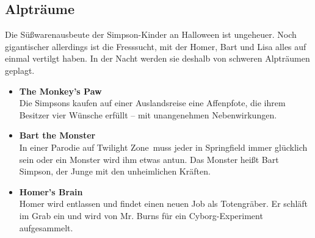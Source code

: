 
\subsection{Alpträume}\label{8F02}
Die Süßwarenausbeute der Simpson-Kinder an Halloween ist ungeheuer. Noch gigantischer allerdings ist die Fresssucht, mit der Homer, Bart und Lisa alles auf einmal vertilgt haben. In der Nacht werden sie deshalb von schweren Alpträumen geplagt. 
\begin{itemize}
	\item \textbf{The Monkey's Paw}\\ Die Simpsons kaufen auf einer Auslandsreise eine Affenpfote, die ihrem Besitzer vier Wünsche erfüllt -- mit unangenehmen Nebenwirkungen.
   \item \textbf{Bart the Monster}\\ In einer Parodie auf \glqq Twilight Zone\grqq\ muss jeder in Springfield immer glücklich sein oder ein Monster wird ihm etwas antun. Das Monster heißt Bart Simpson, der Junge mit den unheimlichen Kräften.
   \item \textbf{Homer's Brain}\\ Homer wird entlassen und findet einen neuen Job als Totengräber. Er schläft im Grab ein und wird von Mr. Burns für ein Cyborg-Experiment aufgesammelt.
\end{itemize}

